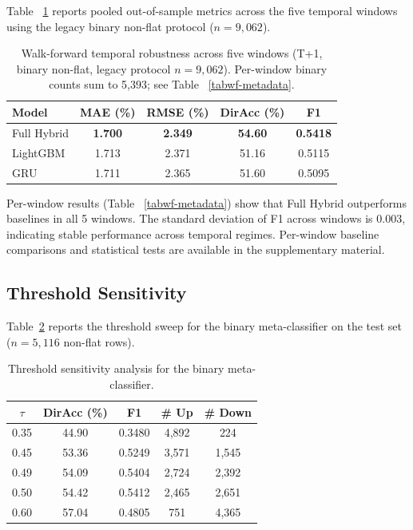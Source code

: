 \documentclass[runningheads]{llncs}
\begin{document}
Table~
\ref{tabwalk-forward} reports pooled out-of-sample metrics across the five temporal windows using the legacy binary non-flat protocol ($n=9,062$).

\begin{table}[htbp]
\centering
\caption{Walk-forward temporal robustness across five windows (T+1, binary non-flat, legacy protocol $n=9,062$). Per-window binary counts sum to 5,393; see Table~
\ref{tabwf-metadata}.}
\label{tabwalk-forward}
\begin{tabular}{lcccc}
\toprule
Model & MAE (\%) & RMSE (\%) & DirAcc (\%) & F1 \\
\midrule
Full Hybrid & \textbf{1.700} & \textbf{2.349} & \textbf{54.60} & \textbf{0.5418} \\
LightGBM & 1.713 & 2.371 & 51.16 & 0.5115 \\
GRU & 1.711 & 2.365 & 51.60 & 0.5095 \\
\bottomrule
\end{tabular}
\end{table}

Per-window results (Table~
\ref{tabwf-metadata}) show that Full Hybrid outperforms baselines in all 5 windows. The standard deviation of F1 across windows is 0.003, indicating stable performance across temporal regimes. Per-window baseline comparisons and statistical tests are available in the supplementary material.

\subsection{Threshold Sensitivity}
\label{secthreshold-sensitivity}

Table~\ref{tabthreshold} reports the threshold sweep for the binary meta-classifier on the test set ($n=5{,}116$ non-flat rows).

\begin{table}[htbp]
\centering
\caption{Threshold sensitivity analysis for the binary meta-classifier.}
\label{tabthreshold}
\begin{tabular}{ccccc}
\toprule
$\tau$ & DirAcc (\%) & F1 & \# Up & \# Down \\
\midrule
0.35 & 44.90 & 0.3480 & 4{,}892 & 224 \\
0.45 & 53.36 & 0.5249 & 3{,}571 & 1{,}545 \\
0.49 & 54.09 & 0.5404 & 2{,}724 & 2{,}392 \\
0.50 & 54.42 & 0.5412 & 2{,}465 & 2{,}651 \\
0.60 & 57.04 & 0.4805 & 751 & 4{,}365 \\
\bottomrule
\end{tabular}
\end{table}
\end{document}
